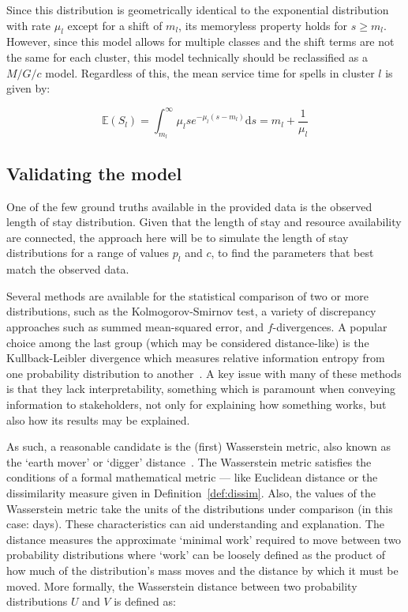 \documentclass[]{interact}
\theoremstyle{plain}%
\theoremstyle{definition}
\theoremstyle{remark}
\begin{document}
Since this distribution is geometrically identical to the exponential
distribution with rate \(\mu_l\) except for a shift of \(m_l\), its memoryless
property holds for \(s \ge m_l\). However, since this model allows for multiple
classes and the shift terms are not the same for each cluster, this model
technically should be reclassified as a \(M/G/c\) model. Regardless of this, the
mean service time for spells in cluster \(l\) is given by:

\begin{equation}\label{eq:services}
    \mathbb E \left(S_l\right)
    = \int_{m_l}^{\infty} \mu_l s e^{-\mu_l (s - m_l)} \mathrm ds
    = m_l + \frac{1}{\mu_l}
\end{equation}

\subsection{Validating the model}\label{subsec:validate}

One of the few ground truths available in the provided data is the observed
length of stay distribution. Given that the length of stay and resource
availability are connected, the approach here will be to simulate the length of
stay distributions for a range of values \(p_l\) and \(c\), to find the
parameters that best match the observed data.

Several methods are available for the statistical comparison of two or more
distributions, such as the Kolmogorov-Smirnov test, a variety of discrepancy
approaches such as summed mean-squared error, and \(f\)-divergences. A popular
choice among the last group (which may be considered distance-like) is the
Kullback-Leibler divergence which measures relative information entropy from one
probability distribution to another~\citep{Kullback1951}. A key issue with many
of these methods is that they lack interpretability, something which is
paramount when conveying information to stakeholders, not only for explaining
how something works, but also how its results may be explained.

As such, a reasonable candidate is the (first) Wasserstein metric, also known as
the `earth mover' or `digger' distance~\citep{Vaserstein1969}. The Wasserstein
metric satisfies the conditions of a formal mathematical metric --- like
Euclidean distance or the dissimilarity measure given in
Definition~\ref{def:dissim}. Also, the values of the Wasserstein metric take the
units of the distributions under comparison (in this case: days). These
characteristics can aid understanding and explanation. The distance measures the
approximate `minimal work' required to move between two probability
distributions where `work' can be loosely defined as the product of how much of
the distribution's mass moves and the distance by which it must be moved. More
formally, the Wasserstein distance between two probability distributions \(U\)
and \(V\) is defined as:
\end{document}
